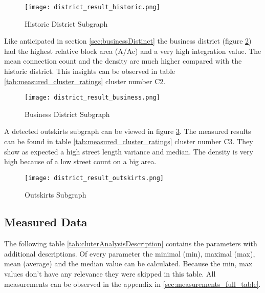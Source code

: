 \begin{figure}[ht]
    \centering
    \begin{mdframed}[style=mdthight, userdefinedwidth=0.4\textwidth, align=center]
        \texttt{[image: district\_result\_historic.png]}
    \end{mdframed}
    \caption{Historic District Subgraph}
    \label{fig:result_historic_district}
\end{figure}
\FloatBarrier

Like anticipated in section \ref{sec:businessDistinct} the business district (figure \ref{fig:result_business_district}) had the highest relative block area (A/Ac) and a very high integration value. The mean connection count and the density are much higher compared with the historic district. This insights can be observed in table \ref{tab:measured_cluster_ratings} cluster number C2.

\begin{figure}[ht]
    \centering
    \begin{mdframed}[style=mdthight, userdefinedwidth=0.4\textwidth, align=center]
        \texttt{[image: district\_result\_business.png]}
    \end{mdframed}
    \caption{Business District Subgraph}
    \label{fig:result_business_district}
\end{figure}
\FloatBarrier

A detected outskirts subgraph can be viewed in figure \ref{fig:result_outskirts_district}. The measured results can be found in table \ref{tab:measured_cluster_ratings} cluster number C3. They show as expected a high street length variance and median. The density is very high because of a low street count on a big area.

\begin{figure}[ht]
    \centering
    \begin{mdframed}[style=mdthight, userdefinedwidth=0.6\textwidth, align=center]
        \texttt{[image: district\_result\_outskirts.png]}
    \end{mdframed}
    \caption{Outskirts Subgraph}
    \label{fig:result_outskirts_district}
\end{figure}
\FloatBarrier

\FloatBarrier
\subsection{Measured Data}
\label{sec:ClusterAnalysisMeasurements}
The following table \ref{tab:cluterAnalysisDescription} contains the parameters with additional descriptions. Of every parameter the minimal (min), maximal (max), mean (average) and the median value can be calculated. Because the min, max values don't have any relevance they were skipped in this table. All measurements can be observed in the appendix in \ref{sec:measurements_full_table}.


